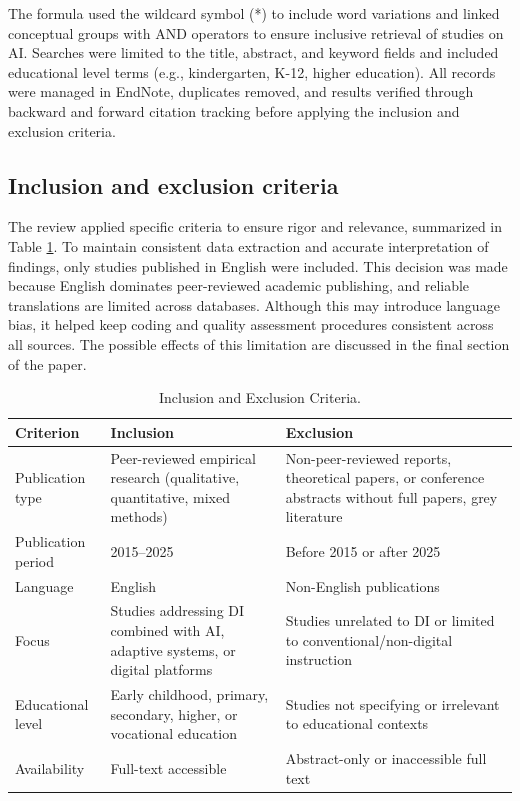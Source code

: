 \documentclass[english]{textolivre}
\begin{document}
The formula used the wildcard symbol (*) to include word variations and linked conceptual groups with AND operators to ensure inclusive retrieval of studies on AI. Searches were limited to the title, abstract, and keyword fields and included educational level terms (e.g., kindergarten, K-12, higher education). All records were managed in EndNote, duplicates removed, and results verified through backward and forward citation tracking before applying the inclusion and exclusion criteria.

\subsection{Inclusion and exclusion criteria}
The review applied specific criteria to ensure rigor and relevance, summarized in Table \ref{tab-1}. To maintain consistent data extraction and accurate interpretation of findings, only studies published in English were included. This decision was made because English dominates peer-reviewed academic publishing, and reliable translations are limited across databases. Although this may introduce language bias, it helped keep coding and quality assessment procedures consistent across all sources. The possible effects of this limitation are discussed in the final section of the paper.

\begin{table}[htbp]
\centering
\begin{threeparttable}
\caption{Inclusion and Exclusion Criteria.}\label{tab-1}
\begin{tabular}{p{2.7cm}p{5.5cm}p{5.2cm}}
\toprule
Criterion & Inclusion & Exclusion \\
\midrule
Publication type & Peer-reviewed empirical research (qualitative, quantitative, mixed methods) & Non-peer-reviewed reports, theoretical papers, or conference abstracts without full papers, grey literature \\
Publication period & 2015--2025 & Before 2015 or after 2025 \\
Language & English & Non-English publications \\
Focus & Studies addressing DI combined with AI, adaptive systems, or digital platforms & Studies unrelated to DI or limited to conventional/non-digital instruction \\
Educational level & Early childhood, primary, secondary, higher, or vocational education & Studies not specifying or irrelevant to educational contexts \\
Availability & Full-text accessible & Abstract-only or inaccessible full text \\
\bottomrule
\end{tabular}
\end{threeparttable}
\end{table}
\end{document}
